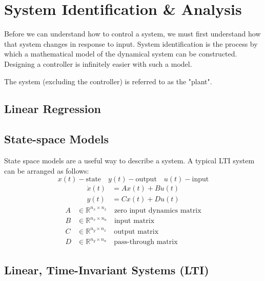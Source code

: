 \documentclass[../notes.tex]{subfiles}
\begin{document}
\section{System Identification \& Analysis}
Before we can understand how to control a system, we must first understand how that system changes in response to input. System identification is the process by which a mathematical model of the dynamical system can be constructed. Designing a controller is infinitely easier with such a model. 
\begin{emphasis}
    The system (excluding the controller) is referred to as the "plant".
\end{emphasis}

\subsection{Linear Regression}
\subsection{State-space Models}
State space models are a useful way to describe a system. A typical LTI system can be arranged as follows:
\begin{equation*}
    x(t) - \text{state} \quad y(t) - \text{output} \quad u(t) - \text{input}
\end{equation*}
\begin{align*}
    \dot{x}(t) &= Ax(t) + Bu(t) \\
    y(t) &= Cx(t) + Du(t)
\end{align*}
\begin{align*}
    A &\in \mathbb{R}^{n_x \times n_x} \quad \text{zero input dynamics matrix}\\
    B &\in \mathbb{R}^{n_x \times n_u} \quad \text{input matrix}\\
    C &\in \mathbb{R}^{n_y \times n_x} \quad \text{output matrix}\\
    D &\in \mathbb{R}^{n_y \times n_u} \quad \text{pass-through matrix}
\end{align*}


\subsection{Linear, Time-Invariant Systems (LTI)}
\end{document}
